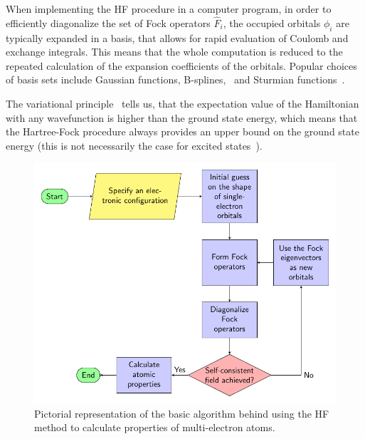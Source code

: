 When implementing the HF procedure in a computer program, in order to efficiently diagonalize the set of Fock operators $\widehat{F}_i$, the occupied orbitals $\phi_i$ are typically expanded in a basis, that allows for rapid evaluation of Coulomb and exchange integrals. This means that the whole computation is reduced to the repeated calculation of the expansion coefficients of the orbitals. Popular choices of basis sets include Gaussian functions, B-splines,~\cite{FROESEFISCHER20111315} and Sturmian functions~\cite{sturmian}.

The variational principle~\cite{epstein2012variation} tells us, that the expectation value of the Hamiltonian with any wavefunction is higher than the ground state energy, which means that the Hartree-Fock procedure always provides an upper bound on the ground state energy (this is not necessarily the case for excited states~\cite{LandauQM}).

\begin{figure} [t] 
	\centering
	\includegraphics[width=119mm]{Graphs/HFalgorithm.pdf} 
	\caption{Pictorial representation of the basic algorithm behind using the HF method to calculate properties of multi-electron atoms.} \label{HFalgo}
\end{figure}

